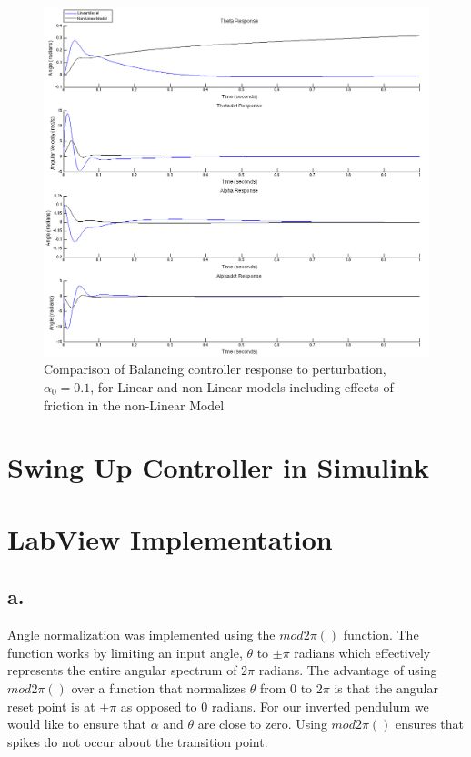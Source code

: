 \documentclass{article}
\theoremstyle{plain}
\theoremstyle{definition}
\theoremstyle{remark}
\begin{document}
\begin{figure}
\begin{center}
\includegraphics[width = 16cm]{nonlinearvslinearwF.png}
\end{center}
\caption{Comparison of Balancing controller response to perturbation, $\alpha_0 = 0.1$, for Linear and non-Linear models including effects of friction in the non-Linear Model}
\label{LvsNonLwF}
\end{figure}

\clearpage
\section{Swing Up Controller in Simulink}



\clearpage
\section{LabView Implementation}

\subsection*{a.}
Angle normalization was implemented using the $mod2\pi()$ function. The function works by limiting an input angle, $\theta$ to $\pm \pi $ radians which effectively represents the entire angular spectrum of $2\pi$ radians. The advantage of using $mod2\pi()$ over a function that normalizes $\theta$ from $0$ to $2\pi$ is that the angular reset point is at $\pm \pi$ as opposed to $0$ radians. For our inverted pendulum we would like to ensure that $\alpha$ and $\theta$ are close to zero. Using $mod2\pi()$ ensures that spikes do not occur about the transition point.\\
\end{document}
